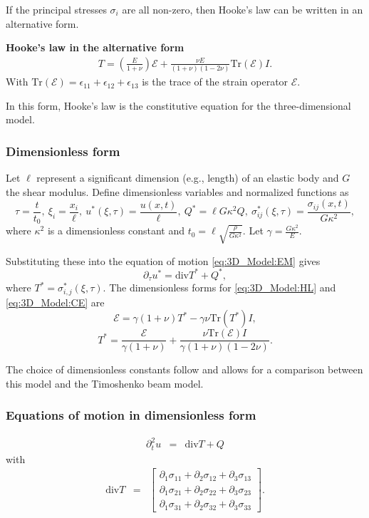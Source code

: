 			If the principal stresses $\sigma_i$ are all non-zero, then Hooke's law can be written in an alternative form.

			\textbf{Hooke's law in the alternative form}
			\begin{eqnarray}
				T = \left( \frac{E}{1+\nu} \right)\mathcal{E} + \frac{\nu E}{(1+\nu)(1-2\nu)}\textrm{Tr}(\mathcal{E})I \label{eq:3D_Model:CE}.
			\end{eqnarray}
			With $\textrm{Tr}(\mathcal{E}) = \epsilon_{11} + \epsilon_{12} + \epsilon_{13}$ is the trace of the strain operator $\mathcal{E}$.

			In this form, Hooke's law is the constitutive equation for the three-dimensional model.

		\subsubsection*{Dimensionless form} \label{ssec:3D_Model:DimensionlessForm}
			Let $\ell$ represent a significant dimension (e.g., length) of an elastic body and $G$ the shear modulus. Define dimensionless variables and normalized functions as
			\[\tau = \frac{t}{t_0},\ \xi_i = \frac{x_i}{\ell},\ u^*(\xi,\tau) = \frac{u(x,t)}{\ell},\ Q^{*} = \ell G \kappa^2 Q,\ \sigma_{ij}^*(\xi,\tau) = \frac{\sigma_{ij}(x,t)}{G\kappa^2},\]
			where $\kappa^2$ is a dimensionless constant and $\displaystyle t_0 = \ell\sqrt{\frac{\rho}{G\kappa^2}}$. Let $\displaystyle \gamma= \frac{G\kappa^2}{E}$.

			Substituting these into the equation of motion \eqref{eq:3D_Model:EM} gives
			\[\partial_{\tau} u^{*} = \text{div}T^* + Q^*,\]
			where $\displaystyle T^* = \sigma_{i,j}^*(\xi,\tau)$. The dimensionless forms for \eqref{eq:3D_Model:HL} and \eqref{eq:3D_Model:CE} are
			\[\mathcal{E} = \gamma(1+\nu)T^* - \gamma\nu \text{Tr}(T^*)I,\]
			\[T^* = \frac{\mathcal{E}}{\gamma(1+\nu)} + \frac{\nu\text{Tr}(\mathcal{E})I}{\gamma(1+\nu)(1-2\nu)}.\]

			The choice of dimensionless constants follow \cite{LVV09} and allows for a comparison between this model and the Timoshenko beam model.


		\subsubsection*{Equations of motion in dimensionless form}\label{sssec:3D_Model:EquationOfMotionDimensionless}
			\begin{eqnarray}
				\partial_t^2 u & = & \textrm{div}T + Q \label{eq:3D_Model:EM-D}
			\end{eqnarray}
			with
			\begin{eqnarray}
				\textrm{div}  T & = &
				\begin{bmatrix}
					\partial_1 \sigma_{11} + \partial_2 \sigma_{12} + \partial_3 \sigma_{13} \\
					\partial_1 \sigma_{21} + \partial_2 \sigma_{22} + \partial_3 \sigma_{23} \\
					\partial_1 \sigma_{31} + \partial_2 \sigma_{32} + \partial_3 \sigma_{33}
				\end{bmatrix}.\label{eq:3D_Model:divT-D}
			\end{eqnarray}

